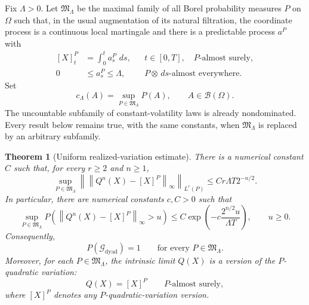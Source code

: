 \documentclass[11pt,reqno]{amsart}
\theoremstyle{plain}
\newtheorem{theorem}{Theorem}[section]
\theoremstyle{definition}
\newcommand{\cG}{\mathcal G}
\newcommand{\dd}{\,d}
\newcommand{\norm}[1]{\left\lVert #1\right\rVert}
\begin{document}
Fix \(\Lambda>0\).  Let \(\mathfrak M_\Lambda\) be the maximal family of all
Borel probability measures \(P\) on \(\Omega\) such that, in the usual
augmentation of its natural filtration, the coordinate process is a
continuous local martingale and there is a predictable process \(a^P\) with
\begin{equation}\label{eq:volatility-bound}
  \begin{aligned}
    [X]^P_t&=\int_0^t a_s^P\,\dd s,
      &&t\in[0,T],\quad P\text{-almost surely},\\
    0&\le a_s^P\le\Lambda,
      &&P\otimes\dd s\text{-almost everywhere}.
  \end{aligned}
\end{equation}
Set
\begin{equation}\label{eq:maximal-capacity}
  c_\Lambda(A)=\sup_{P\in\mathfrak M_\Lambda}P(A),
  \qquad A\in\mathcal B(\Omega).
\end{equation}
The uncountable subfamily of constant-volatility laws is already
nondominated.  Every result below remains true, with the same constants, when
\(\mathfrak M_\Lambda\) is replaced by an arbitrary subfamily.

\begin{theorem}[Uniform realized-variation estimate]
\label{thm:uniform-realized-qv}
There is a numerical constant \(C\) such that, for every \(r\ge2\) and
\(n\ge1\),
\begin{equation}\label{eq:qv-Lr-rate}
  \sup_{P\in\mathfrak M_\Lambda}
  \left\|
    \norm{Q^n(X)-[X]^P}_\infty
  \right\|_{L^r(P)}
  \le
  Cr\Lambda T2^{-n/2}.
\end{equation}
In particular, there are numerical constants \(c,C>0\) such that
\begin{equation}\label{eq:qv-exponential-tail}
  \sup_{P\in\mathfrak M_\Lambda}
  P\!\left(
    \norm{Q^n(X)-[X]^P}_\infty>u
  \right)
  \le
  C\exp\!\left(
    -c\frac{2^{n/2}u}{\Lambda T}
  \right),
  \qquad u\ge0.
\end{equation}
Consequently,
\begin{equation}\label{eq:Gdyad-full-capacity}
  P(\cG_{\mathrm{dyad}})=1
  \qquad\text{for every }P\in\mathfrak M_\Lambda.
\end{equation}
Moreover, for each \(P\in\mathfrak M_\Lambda\), the intrinsic limit \(Q(X)\) is a
version of the \(P\)-quadratic variation:
\begin{equation}\label{eq:intrinsic-qv-identification}
  Q(X)=[X]^P
  \qquad P\text{-almost surely},
\end{equation}
where \([X]^P\) denotes any \(P\)-quadratic-variation version.
\end{theorem}
\end{document}
